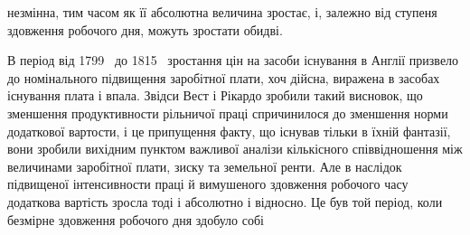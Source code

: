 \parcont{}  %
незмінна, тим часом як її абсолютна величина зростає, і, залежно
від ступеня здовження робочого дня, можуть зростати обидві.

В період від 1799~ до 1815~ зростання цін на засоби існування
в Англії призвело до номінального підвищення заробітної
плати, хоч дійсна, виражена в засобах існування плата і впала.
Звідси Вест і Рікардо зробили такий висновок, що зменшення
продуктивности рільничої праці спричинилося до зменшення
норми додаткової вартости, і це припущення факту, що існував
тільки в їхній фантазії, вони зробили вихідним пунктом важливої
аналізи кількісного співвідношення між величинами заробітної
плати, зиску та земельної ренти. Але в наслідок підвищеної
інтенсивности праці й вимушеного здовження робочого часу
додаткова вартість зросла тоді і абсолютно і відносно. Це був
той період, коли безмірне здовження робочого дня здобуло собі
